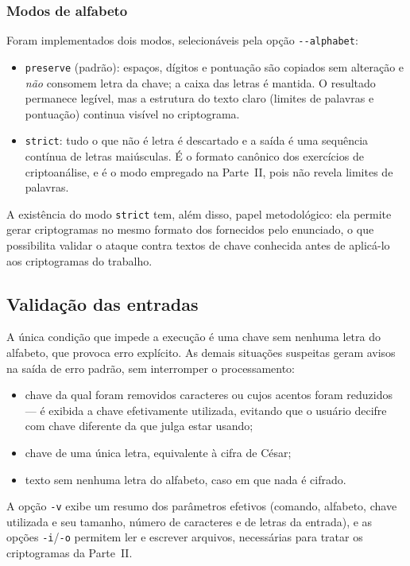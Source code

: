 \documentclass[conference]{IEEEtran}
\begin{document}
\subsubsection{Modos de alfabeto}
Foram implementados dois modos, selecionáveis pela opção
\texttt{-{}-alphabet}:

\begin{itemize}
  \item \texttt{preserve} (padrão): espaços, dígitos e pontuação são copiados
        sem alteração e \emph{não} consomem letra da chave; a caixa das letras
        é mantida. O resultado permanece legível, mas a estrutura do texto
        claro (limites de palavras e pontuação) continua visível no
        criptograma.
  \item \texttt{strict}: tudo o que não é letra é descartado e a saída é uma
        sequência contínua de letras maiúsculas. É o formato canônico dos
        exercícios de criptoanálise, e é o modo empregado na Parte~II, pois
        não revela limites de palavras.
\end{itemize}

A existência do modo \texttt{strict} tem, além disso, papel metodológico: ela
permite gerar criptogramas no mesmo formato dos fornecidos pelo enunciado, o
que possibilita validar o ataque contra textos de chave conhecida antes de
aplicá-lo aos criptogramas do trabalho.

\subsection{Validação das entradas}
A única condição que impede a execução é uma chave sem nenhuma letra do
alfabeto, que provoca erro explícito. As demais situações suspeitas geram
avisos na saída de erro padrão, sem interromper o processamento:

\begin{itemize}
  \item chave da qual foram removidos caracteres ou cujos acentos foram
        reduzidos --- é exibida a chave efetivamente utilizada, evitando que o
        usuário decifre com chave diferente da que julga estar usando;
  \item chave de uma única letra, equivalente à cifra de César;
  \item texto sem nenhuma letra do alfabeto, caso em que nada é cifrado.
\end{itemize}

A opção \texttt{-v} exibe um resumo dos parâmetros efetivos (comando,
alfabeto, chave utilizada e seu tamanho, número de caracteres e de letras da
entrada), e as opções \texttt{-i}/\texttt{-o} permitem ler e escrever
arquivos, necessárias para tratar os criptogramas da Parte~II.
\end{document}
